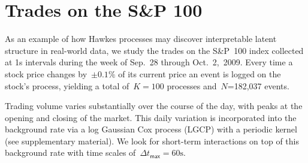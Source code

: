 \section{Trades on the S\&P 100}
\label{sec:financial}
As an example of how Hawkes processes may discover interpretable latent structure in real-world data, we study the trades on the S\&P~100 index collected at 1s intervals during the week of Sep.~28 through Oct.~2,~2009. Every time a stock price changes by~${\pm0.1\%}$ of its current price an event is logged on the stock's process, yielding a total of~${K=100}$ processes and~${N}$=182,037 events.

Trading volume varies substantially over the course of the day, with peaks at the opening and closing of the market. This daily variation is incorporated into the background rate via a log Gaussian Cox process (LGCP) with a periodic kernel (see supplementary material). We look for short-term interactions on top of this background rate with time scales of~${\Delta t_{\textsf{max}}=60\mathrm{s}}$. 
